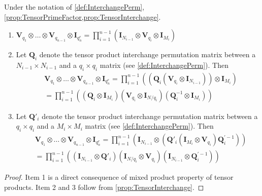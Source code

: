 \begin{corollary} \label{cor:TensorPrimeInterchange}
    Under the notation of \cref{def:InterchangePerm}, \cref{prop:TensorPrimeFactor,prop:TensorInterchange}.
    \begin{enumerate}
        \item \(\bm{V}_{q_1} \otimes \ldots \otimes \bm{V}_{q_{n-1}} \otimes \bm{I}_{q_n^e} = \prod_{i=1}^{n-1} \left(\bm{I}_{N_{i-1}} \otimes \bm{V}_{q_i} \otimes \bm{I}_{M_i}\right)\)
        \item Let \(\bm{Q}_i\) denote the tensor product interchange permutation matrix between a \(N_{i-1} \times N_{i-1}\) and a \(q_i \times q_i\) matrix (see \cref{def:InterchangePerm}). Then
            \begin{align*}
                & \bm{V}_{q_1} \otimes \ldots \otimes \bm{V}_{q_{n-1}} \otimes \bm{I}_{q_n^e}
                = \prod_{i=1}^{n-1} \left(\left(\bm{Q}_i \left(\bm{V}_{q_i} \otimes \bm{I}_{N_{i-1}}\right)\right) \otimes \bm{I}_{M_i}\right) \\
                &= \prod_{i=1}^{n-1} \left( \left(\bm{Q}_i \otimes \bm{I}_{M_i}\right) \left(\bm{V}_{q_i} \otimes \bm{I}_{N/q_i}\right) \left(\bm{Q}_i^{-1} \otimes \bm{I}_{M_i}\right)\right)
            \end{align*}
        \item Let \(\bm{Q}'_i\) denote the tensor product interchange permutation matrix between a \(q_i \times q_i\) and a \(M_i \times M_i\) matrix (see \cref{def:InterchangePerm}). Then
            \begin{align*}
                & \bm{V}_{q_1} \otimes \ldots \otimes \bm{V}_{q_{n-1}} \otimes \bm{I}_{q_n^e}
                = \prod_{i=1}^{n-1} \left( \bm{I}_{N_{i-1}} \otimes \left(\bm{Q}'_i \left(\bm{I}_{M_i} \otimes \bm{V}_{q_i}\right) \bm{Q}_i^{'-1}\right)\right) \\
                &= \prod_{i=1}^{n-1} \left(\left(\bm{I}_{N_{i-1}} \otimes \bm{Q}'_i\right) \left(\bm{I}_{N/q_i} \otimes \bm{V}_{q_i}\right) \left(\bm{I}_{N_{i-1}} \otimes \bm{Q}_i^{'-1}\right)\right)
            \end{align*}
    \end{enumerate}
\end{corollary}
\begin{proof}
    Item 1 is a direct consequence of mixed product property of tensor products. Item 2 and 3 follow from \cref{prop:TensorInterchange}.
\end{proof}

